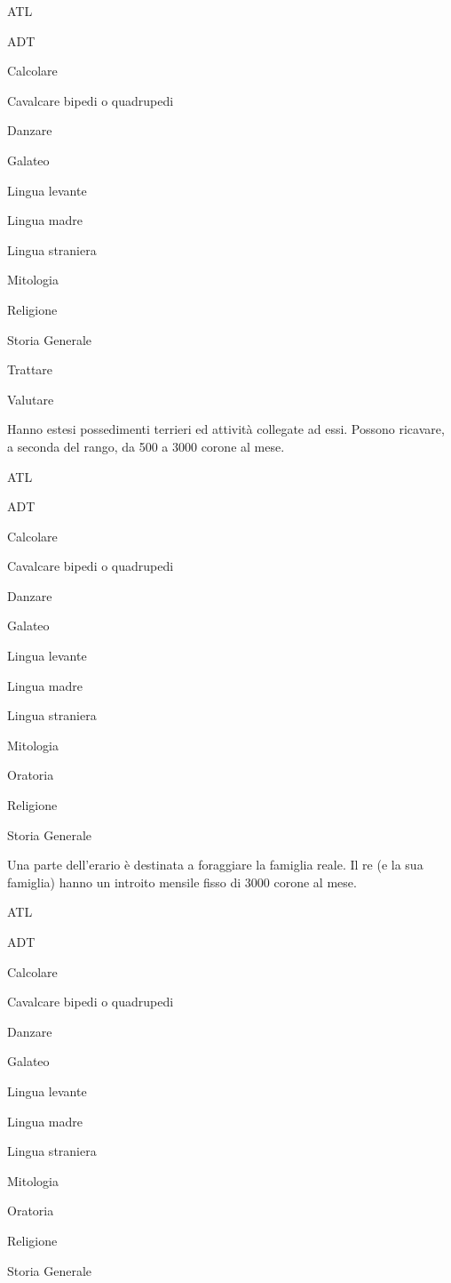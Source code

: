 \begin{abilist}
\item ATL
\item ADT
\item Calcolare
\item Cavalcare bipedi o quadrupedi
\item Danzare
\item Galateo
\item Lingua levante
\item Lingua madre
\item Lingua straniera
\item Mitologia
\item Religione
\item Storia Generale
\item Trattare
\item Valutare
\end{abilist}


Hanno estesi possedimenti terrieri ed attivit\`a collegate ad essi.
Possono ricavare, a seconda del rango, da 500 a 3000 corone al mese.

\begin{abilist}
\item ATL
\item ADT
\item Calcolare
\item Cavalcare bipedi o quadrupedi
\item Danzare
\item Galateo
\item Lingua levante
\item Lingua madre
\item Lingua straniera
\item Mitologia
\item Oratoria
\item Religione
\item Storia Generale
\end{abilist}


Una parte dell'erario \`e destinata a foraggiare la famiglia reale.
Il re (e la sua famiglia) hanno un introito mensile fisso di 3000
corone al mese.

\begin{abilist}
\item ATL
\item ADT
\item Calcolare
\item Cavalcare bipedi o quadrupedi
\item Danzare
\item Galateo
\item Lingua levante
\item Lingua madre
\item Lingua straniera
\item Mitologia
\item Oratoria
\item Religione
\item Storia Generale
\end{abilist}


